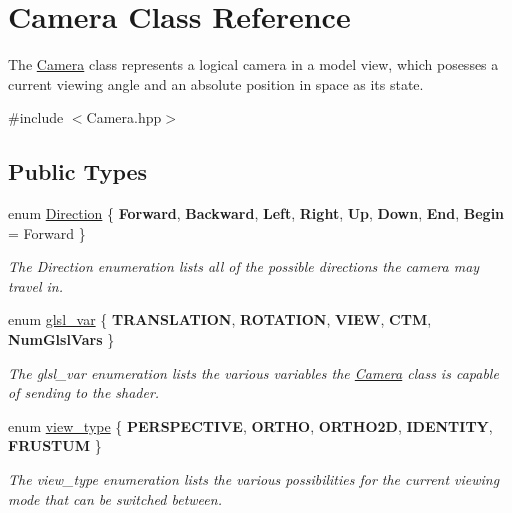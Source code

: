 \hypertarget{class_camera}{\section{\-Camera \-Class \-Reference}
\label{class_camera}
}


\-The \hyperlink{class_camera}{\-Camera} class represents a logical camera in a model view, which posesses a current viewing angle and an absolute position in space as its state.  




{\ttfamily \#include $<$\-Camera.\-hpp$>$}

\subsection*{\-Public \-Types}
\begin{DoxyCompactItemize}
\item 
enum \hyperlink{class_camera_a80cb65605322d27ad3b6d973484509ec}{\-Direction} \{ \*
{\bfseries \-Forward}, 
{\bfseries \-Backward}, 
{\bfseries \-Left}, 
{\bfseries \-Right}, 
\*
{\bfseries \-Up}, 
{\bfseries \-Down}, 
{\bfseries \-End}, 
{\bfseries \-Begin} =  \-Forward
 \}
\begin{DoxyCompactList}\small\item\em \-The \-Direction enumeration lists all of the possible directions the camera may travel in. \end{DoxyCompactList}\item 
enum \hyperlink{class_camera_a6ff726a75a430e4f17e5dec42e4d4405}{glsl\-\_\-var} \{ \*
{\bfseries \-T\-R\-A\-N\-S\-L\-A\-T\-I\-O\-N}, 
{\bfseries \-R\-O\-T\-A\-T\-I\-O\-N}, 
{\bfseries \-V\-I\-E\-W}, 
{\bfseries \-C\-T\-M}, 
\*
{\bfseries \-Num\-Glsl\-Vars}
 \}
\begin{DoxyCompactList}\small\item\em \-The glsl\-\_\-var enumeration lists the various variables the \hyperlink{class_camera}{\-Camera} class is capable of sending to the shader. \end{DoxyCompactList}\item 
enum \hyperlink{class_camera_afdccec6d447490dcc80ab6b99f21d0e5}{view\-\_\-type} \{ \*
{\bfseries \-P\-E\-R\-S\-P\-E\-C\-T\-I\-V\-E}, 
{\bfseries \-O\-R\-T\-H\-O}, 
{\bfseries \-O\-R\-T\-H\-O2\-D}, 
{\bfseries \-I\-D\-E\-N\-T\-I\-T\-Y}, 
\*
{\bfseries \-F\-R\-U\-S\-T\-U\-M}
 \}
\begin{DoxyCompactList}\small\item\em \-The view\-\_\-type enumeration lists the various possibilities for the current viewing mode that can be switched between. \end{DoxyCompactList}\end{DoxyCompactItemize}
